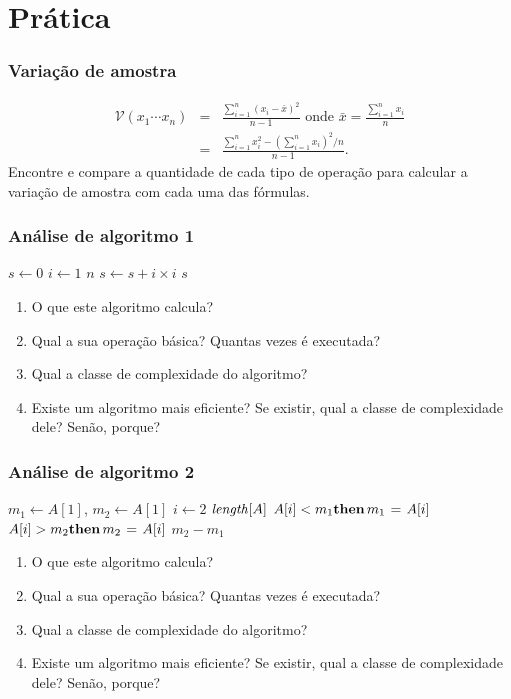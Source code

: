 \documentclass[handout]{beamer}
\begin{document}
\section{Prática}

\begin{frame}
\frametitle{Variação de amostra}

\begin{problem}
\begin{eqnarray*}
\mathcal{V}(x_1 \cdots x_n) & = & \frac{\sum_{i=1}^{n} (x_i - \bar{x})^2}{n-1}
\mbox{ onde } \bar{x} = \frac{\sum_{i=1}^{n} x_i}{n} \\
& = & \frac{\sum_{i=1}^n x_i^2 - (\sum_{i=1}^n x_i)^2/n}{n-1}.
\end{eqnarray*}
Encontre e compare a quantidade de cada tipo de operação para calcular a
variação de amostra com cada uma das fórmulas.
\end{problem}
\end{frame}

\begin{frame}
\frametitle{Análise de algoritmo 1}

\begin{problem}
\begin{codebox}
\li $s \gets 0$
\li \For $i \gets 1$ \To $n$
    \Do
\li   $s \gets s + i \times i$
    \End
\li \Return $s$
\end{codebox}
\begin{enumerate}
\item O que este algoritmo calcula?
\item Qual a sua operação básica? Quantas vezes é executada?
\item Qual a classe de complexidade do algoritmo?
\item Existe um algoritmo mais eficiente? Se existir, qual a classe de complexidade dele? Senão, porque?
\end{enumerate}
\end{problem}
\end{frame}

\begin{frame}
\frametitle{Análise de algoritmo 2}

\begin{problem}
\begin{codebox}
\li $m_1 \gets A[1]$, $m_2 \gets A[1]$
\li \For $i \gets 2$ \To $\id{length}[A]$
\li \Do
      \If $A[i] < m_1 \textbf{then}\, m_1 \mathrel{\hspace{1pt}=\hspace{1pt}} A[i]$
\li   \If $A[i] > m_2 \textbf{then}\, m_2 \mathrel{\hspace{1pt}=\hspace{1pt}} A[i]$
    \End
\li \Return $m_2 - m_1$
\end{codebox}
\begin{enumerate}
\item O que este algoritmo calcula?
\item Qual a sua operação básica? Quantas vezes é executada?
\item Qual a classe de complexidade do algoritmo?
\item Existe um algoritmo mais eficiente? Se existir, qual a classe de complexidade dele? Senão, porque?
\end{enumerate}
\end{problem}
\end{frame}
\end{document}
